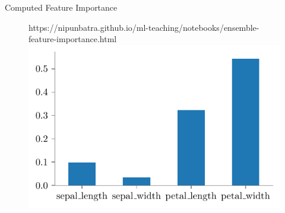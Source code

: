 \documentclass[9pt]{beamer}
\newcommand{\fitpic}[1]{\begin{adjustbox}{max width=\linewidth, max totalheight=0.78\textheight}#1\end{adjustbox}}
\begin{document}
\begin{frame}{Computed Feature Importance}
  \begin{figure}[htp]
    \centering
    \begin{notebookbox}{https://nipunbatra.github.io/ml-teaching/notebooks/ensemble-feature-importance.html}
      \fitpic{\includegraphics[scale=0.8]{../assets/ensemble/figures/feature-imp-forest.pdf}}
    \end{notebookbox}
\end{figure}
\end{frame}
\end{document}

